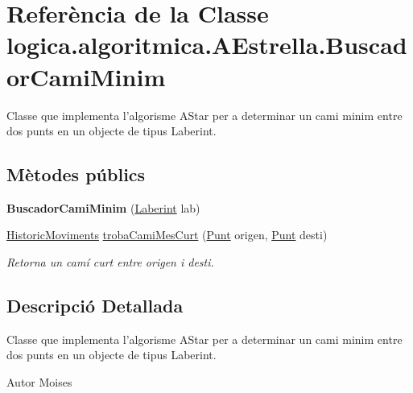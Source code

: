 \hypertarget{classlogica_1_1algoritmica_1_1_a_estrella_1_1_buscador_cami_minim}{\section{Referència de la Classe logica.\+algoritmica.\+A\+Estrella.\+Buscador\+Cami\+Minim}
\label{classlogica_1_1algoritmica_1_1_a_estrella_1_1_buscador_cami_minim}
}


Classe que implementa l'algorisme A\+Star per a determinar un cami minim entre dos punts en un objecte de tipus Laberint.  


\subsection*{Mètodes públics}
\begin{DoxyCompactItemize}
\item 
\hypertarget{classlogica_1_1algoritmica_1_1_a_estrella_1_1_buscador_cami_minim_aa83d350da116b2748bbd714081720017}{{\bfseries Buscador\+Cami\+Minim} (\hyperlink{classlogica_1_1laberints_1_1_laberint}{Laberint} lab)}\label{classlogica_1_1algoritmica_1_1_a_estrella_1_1_buscador_cami_minim_aa83d350da116b2748bbd714081720017}

\item 
\hyperlink{classlogica_1_1historic__moviments_1_1_historic_moviments}{Historic\+Moviments} \hyperlink{classlogica_1_1algoritmica_1_1_a_estrella_1_1_buscador_cami_minim_a31bce579bd1b302c4eaa16f981655454}{troba\+Cami\+Mes\+Curt} (\hyperlink{classlogica_1_1_punt}{Punt} origen, \hyperlink{classlogica_1_1_punt}{Punt} desti)
\begin{DoxyCompactList}\small\item\em Retorna un camí curt entre origen i desti. \end{DoxyCompactList}\end{DoxyCompactItemize}


\subsection{Descripció Detallada}
Classe que implementa l'algorisme A\+Star per a determinar un cami minim entre dos punts en un objecte de tipus Laberint. 

\begin{DoxyAuthor}{Autor}
Moises 
\end{DoxyAuthor}


